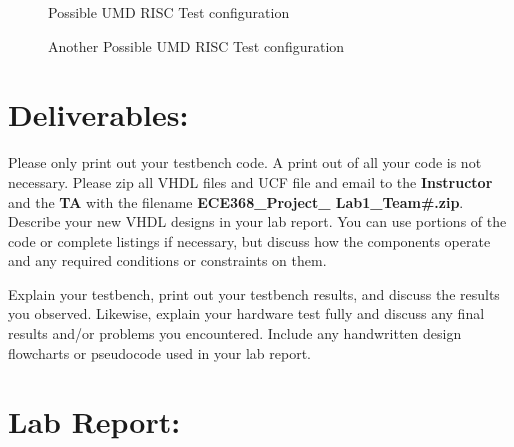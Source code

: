 \documentclass{article}
\begin{document}
\begin{figure}[!htbp]
  \centering
  \caption{Possible UMD RISC Test configuration}
  \label{fig:test_configuration}
\end{figure}

\begin{figure}[!htbp]
  \centering
  \caption{Another Possible UMD RISC Test configuration}
  \label{fig:test_configuration2}
\end{figure}


\newpage

\section{Deliverables:}

Please only print out your testbench code. A print out of all your code is not necessary. Please zip all VHDL files and UCF file and email to the \textbf{Instructor} and the \textbf{TA} with the filename \textbf{ECE368\_Project\_ Lab1\_Team\#.zip}. Describe your new VHDL designs in your lab report. You can use portions of the code or complete listings if necessary, but discuss how the components operate and any required conditions or constraints on them.

Explain your testbench, print out your testbench results, and discuss the results you observed. Likewise, explain your hardware test fully and discuss any final results and/or problems you encountered. Include any handwritten design flowcharts or pseudocode used in your lab report.

\section{Lab Report:}
\end{document}
